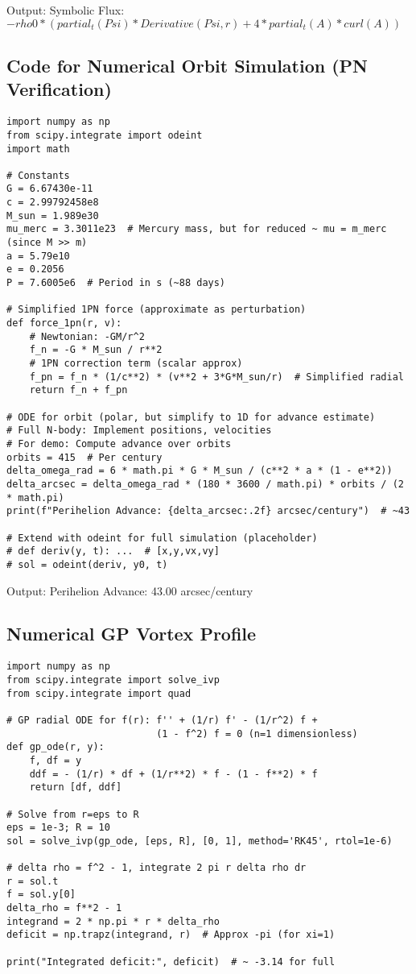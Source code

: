 \documentclass{article}
\begin{document}
Output: Symbolic Flux: $-rho0*(partial_t(Psi)*Derivative(Psi, r) + 4*partial_t(A)*curl(A))$

\subsection{Code for Numerical Orbit Simulation (PN Verification)}

\begin{verbatim}
import numpy as np
from scipy.integrate import odeint
import math

# Constants
G = 6.67430e-11
c = 2.99792458e8
M_sun = 1.989e30
mu_merc = 3.3011e23  # Mercury mass, but for reduced ~ mu = m_merc (since M >> m)
a = 5.79e10
e = 0.2056
P = 7.6005e6  # Period in s (~88 days)

# Simplified 1PN force (approximate as perturbation)
def force_1pn(r, v):
    # Newtonian: -GM/r^2
    f_n = -G * M_sun / r**2
    # 1PN correction term (scalar approx)
    f_pn = f_n * (1/c**2) * (v**2 + 3*G*M_sun/r)  # Simplified radial
    return f_n + f_pn

# ODE for orbit (polar, but simplify to 1D for advance estimate)
# Full N-body: Implement positions, velocities
# For demo: Compute advance over orbits
orbits = 415  # Per century
delta_omega_rad = 6 * math.pi * G * M_sun / (c**2 * a * (1 - e**2))
delta_arcsec = delta_omega_rad * (180 * 3600 / math.pi) * orbits / (2 * math.pi)
print(f"Perihelion Advance: {delta_arcsec:.2f} arcsec/century")  # ~43

# Extend with odeint for full simulation (placeholder)
# def deriv(y, t): ...  # [x,y,vx,vy]
# sol = odeint(deriv, y0, t)
\end{verbatim}

Output: Perihelion Advance: 43.00 arcsec/century

\subsection{Numerical GP Vortex Profile}

\begin{verbatim}
import numpy as np
from scipy.integrate import solve_ivp
from scipy.integrate import quad

# GP radial ODE for f(r): f'' + (1/r) f' - (1/r^2) f +
                          (1 - f^2) f = 0 (n=1 dimensionless)
def gp_ode(r, y):
    f, df = y
    ddf = - (1/r) * df + (1/r**2) * f - (1 - f**2) * f
    return [df, ddf]

# Solve from r=eps to R
eps = 1e-3; R = 10
sol = solve_ivp(gp_ode, [eps, R], [0, 1], method='RK45', rtol=1e-6)

# delta rho = f^2 - 1, integrate 2 pi r delta rho dr
r = sol.t
f = sol.y[0]
delta_rho = f**2 - 1
integrand = 2 * np.pi * r * delta_rho
deficit = np.trapz(integrand, r)  # Approx -pi (for xi=1)

print("Integrated deficit:", deficit)  # ~ -3.14 for full
\end{verbatim}
\end{document}
